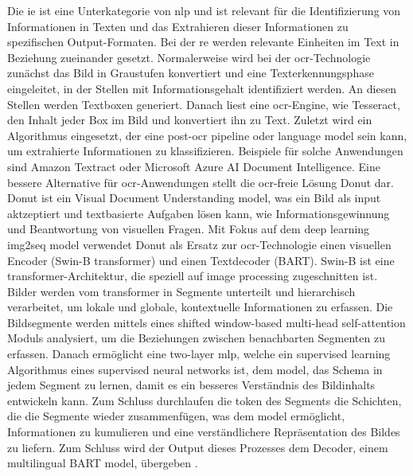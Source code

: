 Die \gls{ie} ist eine Unterkategorie von \gls{nlp} und ist relevant für die Identifizierung von Informationen in Texten und das Extrahieren dieser Informationen zu spezifischen Output-Formaten. Bei der \gls{re} werden relevante Einheiten im Text in Beziehung zueinander gesetzt. Normalerweise wird bei der \gls{ocr}-Technologie zunächst das Bild in Graustufen konvertiert und eine Texterkennungsphase eingeleitet, in der Stellen mit Informationsgehalt identifiziert werden. An diesen Stellen werden Textboxen generiert. Danach liest eine \gls{ocr}-Engine, wie Tesseract, den Inhalt jeder Box im Bild und konvertiert ihn zu Text. Zuletzt wird ein Algorithmus eingesetzt, der eine post-\gls{ocr} pipeline oder language model sein kann, um extrahierte Informationen zu klassifizieren. Beispiele für solche Anwendungen sind Amazon Textract oder Microsoft Azure AI Document Intelligence. Eine bessere Alternative für \gls{ocr}-Anwendungen stellt die \gls{ocr}-freie Lösung Donut dar. Donut ist ein Visual Document Understanding model, was ein Bild als input aktzeptiert und textbasierte Aufgaben lösen kann, wie Informationsgewinnung und Beantwortung von visuellen Fragen. Mit Fokus auf dem deep learning img2seq model verwendet Donut als Ersatz zur \gls{ocr}-Technologie einen visuellen Encoder (Swin-B transformer) und einen Textdecoder (BART). Swin-B ist eine transformer-Architektur, die speziell auf image processing zugeschnitten ist. Bilder werden vom transformer in Segmente unterteilt und hierarchisch verarbeitet, um lokale und globale, kontextuelle Informationen zu erfassen. Die Bildsegmente werden mittels eines shifted window-based multi-head self-attention Moduls analysiert, um die Beziehungen zwischen benachbarten Segmenten zu erfassen. Danach ermöglicht eine two-layer \gls{mlp}, welche ein supervised learning Algorithmus eines supervised neural networks ist, dem model, das Schema in jedem Segment zu lernen, damit es ein besseres Verständnis des Bildinhalts entwickeln kann. Zum Schluss durchlaufen die token des Segments die Schichten, die die Segmente wieder zusammenfügen, was dem model ermöglicht, Informationen zu kumulieren und eine verständlichere Repräsentation des Bildes zu liefern. Zum Schluss wird der Output dieses Prozesses dem Decoder, einem multilingual BART model, übergeben \cite{transformers-ocr}. \\
